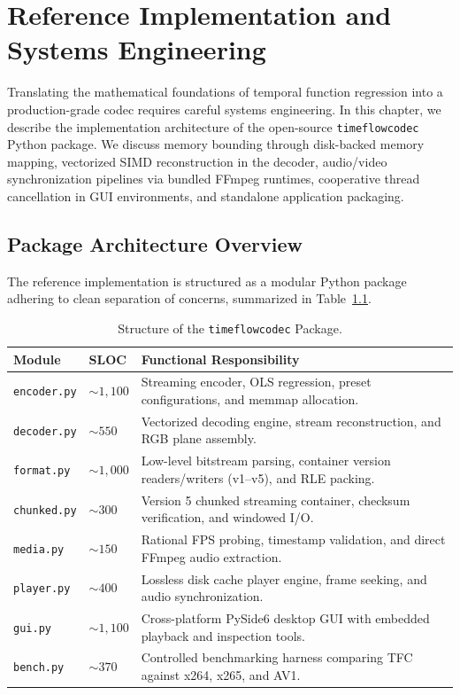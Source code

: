 \chapter{Reference Implementation and Systems Engineering}
\label{chap:implementation}

Translating the mathematical foundations of temporal function regression into a production-grade codec requires careful systems engineering. In this chapter, we describe the implementation architecture of the open-source \texttt{timeflowcodec} Python package. We discuss memory bounding through disk-backed memory mapping, vectorized SIMD reconstruction in the decoder, audio/video synchronization pipelines via bundled FFmpeg runtimes, cooperative thread cancellation in GUI environments, and standalone application packaging.

\section{Package Architecture Overview}
The reference implementation is structured as a modular Python package adhering to clean separation of concerns, summarized in Table~\ref{tab:codebase_modules}.

\begin{table}[h]
\centering
\small
\caption{Structure of the \texttt{timeflowcodec} Package.}
\label{tab:codebase_modules}
\begin{tabular}{llp{7.5cm}}
\toprule
\textbf{Module} & \textbf{SLOC} & \textbf{Functional Responsibility} \\
\midrule
\texttt{encoder.py} & $\sim 1,100$ & Streaming encoder, OLS regression, preset configurations, and memmap allocation. \\
\texttt{decoder.py} & $\sim 550$ & Vectorized decoding engine, stream reconstruction, and RGB plane assembly. \\
\texttt{format.py} & $\sim 1,000$ & Low-level bitstream parsing, container version readers/writers (v1--v5), and RLE packing. \\
\texttt{chunked.py} & $\sim 300$ & Version 5 chunked streaming container, checksum verification, and windowed I/O. \\
\texttt{media.py} & $\sim 150$ & Rational FPS probing, timestamp validation, and direct FFmpeg audio extraction. \\
\texttt{player.py} & $\sim 400$ & Lossless disk cache player engine, frame seeking, and audio synchronization. \\
\texttt{gui.py} & $\sim 1,100$ & Cross-platform PySide6 desktop GUI with embedded playback and inspection tools. \\
\texttt{bench.py} & $\sim 370$ & Controlled benchmarking harness comparing TFC against x264, x265, and AV1. \\
\bottomrule
\end{tabular}
\end{table}

